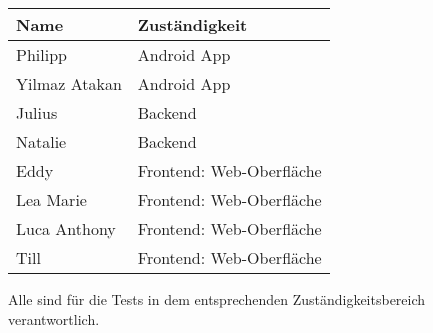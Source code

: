 \begin{center}
\begin{tabular}{ll}
 \rowcolor[HTML]{E7E7E7} 
 \textbf{Name} & \textbf{Zuständigkeit} \\ \hline
 Philipp &  Android App \\ 
 Yilmaz Atakan & Android App \\
 
  \rowcolor[HTML]{E7E7E7} 
  Julius & Backend \\  
   \rowcolor[HTML]{E7E7E7} 
 Natalie & Backend \\
 
 Eddy & Frontend: Web-Oberfläche \\  
 Lea Marie & Frontend: Web-Oberfläche \\ 
 Luca Anthony & Frontend: Web-Oberfläche \\ 
 Till & Frontend: Web-Oberfläche \\ 
\end{tabular}
\end{center}
\bigskip

Alle sind für die Tests in dem entsprechenden Zuständigkeitsbereich verantwortlich.


